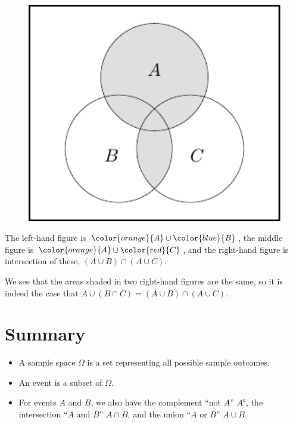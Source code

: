 \documentclass[
  letterpaper,
  DIV=11,
  numbers=noendperiod]{scrreprt}
\providecommand{\tightlist}{%
  \setlength{\itemsep}{0pt}\setlength{\parskip}{0pt}}\usepackage{longtable,booktabs,array}
\theoremstyle{remark}
\begin{document}
~

\begin{figure}

{\centering \includegraphics[width=1\textwidth,height=\textheight]{sections/L03-events_files/figure-pdf/dist6-1.pdf}

}

\end{figure}

The left-hand figure is \(\color{orange}{A} \cup \color{blue}{B}\), the
middle figure is \(\color{orange}{A}\cup \color{red}{C}\), and the
right-hand figure is intersection of these, \((A\cup B)\cap (A\cup C)\).

We see that the areas shaded in two right-hand figures are the same, so
it is indeed the case that
\(A\cup (B\cap C) = (A\cup B)\cap (A\cup C)\).

\hypertarget{summary-L03}{%
\section*{Summary}\label{summary-L03}}


\begin{itemize}
\tightlist
\item
  A sample space \(\Omega\) is a set representing all possible sample
  outcomes.
\item
  An event is a subset of \(\Omega\).
\item
  For events \(A\) and \(B\), we also have the complement ``not \(A\)''
  \(A^\mathsf{c}\), the intersection ``\(A\) and \(B\)'' \(A \cap B\),
  and the union ``\(A\) or \(B\)'' \(A \cup B\).
\end{itemize}
\end{document}
